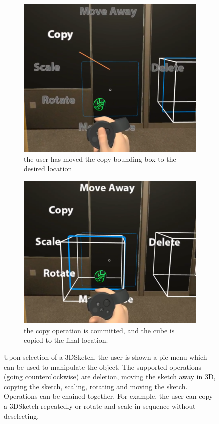 \documentclass[chi_draft]{sigchi}
\begin{document}
\begin{figure}
\begin{subfigure}[b]{0.4\columnwidth}
    \end{subfigure}
    \begin{subfigure}[b]{0.4\columnwidth}
        \includegraphics[width=1\columnwidth]{piemenu3.png}
        \caption{the user has moved the copy bounding box to the desired location}
    \end{subfigure}
    \begin{subfigure}[b]{0.4\columnwidth}
        \includegraphics[width=1\columnwidth]{piemenu4.png}
        \caption{the copy operation is committed, and the cube is copied to the final location.}
    \end{subfigure}
    \caption{Upon selection of a 3DSketch, the user is shown a pie menu which can be used to manipulate the object. The supported operations (going counterclockwise) are deletion, moving the sketch away in 3D, copying the sketch, scaling, rotating and moving the sketch. Operations can be chained together. For example,
    the user can copy a 3DSketch repeatedly or rotate and scale in sequence without deselecting.}
\end{figure}
\end{document}
